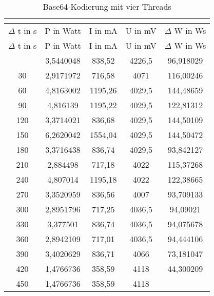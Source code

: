 
\begin{longtable}[c]{ccccc}
\caption{Base64-Kodierung mit vier Threads} \\
\label{tab:Base64MessungThreadVier}\\
\hline
{$\Delta$ t in s} & {P in Watt} & {I in mA} & {U in mV} & {$\Delta$ W in Ws} \\
\hline
\endfirsthead
\hline
$\Delta$ t in s & P in Watt & I in mA & U in mV & $\Delta$ W in Ws \\
\hline
\endhead
\hline
\endfoot
\hline
        \midrule
    0     & 3,5440048 & 838,52 & 4226,5 & 96,918029 \\
    \midrule
    30    & 2,9171972 & 716,58 & 4071  & 116,00246 \\
    \midrule
    60    & 4,8163002 & 1195,26 & 4029,5 & 144,48659 \\
    \midrule
    90    & 4,816139 & 1195,22 & 4029,5 & 122,81312 \\
    \midrule
    120   & 3,3714021 & 836,68 & 4029,5 & 144,50109 \\
    \midrule
    150   & 6,2620042 & 1554,04 & 4029,5 & 144,50472 \\
    \midrule
    180   & 3,3716438 & 836,74 & 4029,5 & 93,842127 \\
    \midrule
    210   & 2,884498 & 717,18 & 4022  & 115,37268 \\
    \midrule
    240   & 4,807014 & 1195,18 & 4022  & 122,38665 \\
    \midrule
    270   & 3,3520959 & 836,56 & 4007  & 93,709133 \\
    \midrule
    300   & 2,8951796 & 717,25 & 4036,5 & 94,09021 \\
    \midrule
    330   & 3,377501 & 836,74 & 4036,5 & 94,075678 \\
    \midrule
    360   & 2,8942109 & 717,01 & 4036,5 & 94,444106 \\
    \midrule
    390   & 3,4020629 & 836,71 & 4066  & 73,181047 \\
    \midrule
    420   & 1,4766736 & 358,59 & 4118  & 44,300209 \\
    \midrule
    450   & 1,4766736 & 358,59 & 4118  &  \\
\end{longtable}


